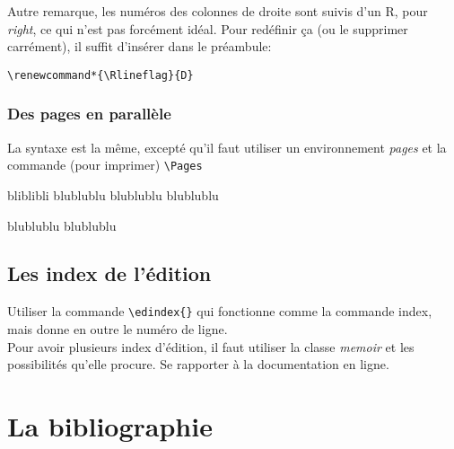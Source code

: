 \documentclass[a4paper,twoside,french,12pt]{book}
\renewcommand*{\Rlineflag}{D}
\begin{document}
Autre remarque, les numéros des colonnes de droite sont suivis d'un R, pour \textit{right}, ce qui n'est pas forcément idéal. Pour redéfinir ça (ou le supprimer carrément), il suffit d'insérer dans le préambule:
\begin{verbatim}
\renewcommand*{\Rlineflag}{D}
\end{verbatim}




\subsubsection{Des pages en parallèle}
La syntaxe est la même, excepté qu'il faut utiliser un environnement \textit{pages} et la commande (pour imprimer) \verb=\Pages=

\begin{pages}
\begin{Leftside}
\beginnumbering
\pstart {} \pend
\pstart bliblibli \pend
\pstart blublublu \pend
\pstart blublublu \pend
\pstart blublublu \pend
\endnumbering
\end{Leftside}
\begin{Rightside}
\beginnumbering
\pstart {} \pend
\pstart {} \pend
\pstart blublublu \pend
\pstart  \pend
\pstart blublublu%
\pend
\endnumbering
\end{Rightside}
\Pages
\end{pages}



\subsection{Les index de l'édition}

Utiliser la commande \verb=\edindex{}= qui fonctionne comme la commande index, mais donne en outre le numéro de ligne.\\

Pour avoir plusieurs index d'édition, il faut utiliser la classe \textit{memoir} et les possibilités qu'elle procure. Se rapporter à la documentation en ligne.


\section{La bibliographie}
\end{document}
